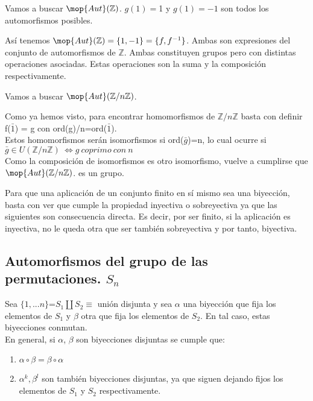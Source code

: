 \documentclass[nochap]{apuntes}
\begin{document}
\begin{example}
 Vamos a buscar $\mop{Aut}(\mathbb{Z})$. $g(1)=$1 y $g(1)=-1$ son todos los automorfismos posibles.
 
 Así tenemos $\mop{Aut}(\mathbb{Z})=\{1,-1\}=\{f, f^{-1}\}$. Ambas son expresiones del conjunto de automorfismos de $\mathbb{Z}$. Ambas constituyen grupos pero con distintas operaciones asociadas. Estas operaciones son la suma y la composición respectivamente.
\end{example}

\begin{example}
 Vamos a buscar $\mop{Aut}(\mathbb{Z}/n\mathbb{Z})$.
 
 Como ya hemos visto, para encontrar homomorfismos de $\mathbb{Z}/n\mathbb{Z}$  basta con definir f($\bar{1}$) = g con ord(g)/n=ord($\bar{1}$).\\
 Estos homomorfismos serán isomorfismos si  ord($\bar{g}$)=n, lo cual ocurre si $\bar{g}\in U(\mathbb{Z}/n\mathbb{Z}) \ \Leftrightarrow g \ coprimo \ con\ n$\\
 Como la composición de isomorfismos es otro isomorfismo, vuelve a cumplirse que $\mop{Aut}(\mathbb{Z}/n\mathbb{Z})$.  es un grupo.
\end{example}

Para que una aplicación de un conjunto finito en sí mismo sea una biyección, basta con ver que cumple la propiedad inyectiva o sobreyectiva ya que las siguientes son consecuencia directa. Es decir, por ser finito, si la aplicación es inyectiva, no le queda otra que ser también sobreyectiva y por tanto, biyectiva.

\subsection{Automorfismos del grupo de las permutaciones. $S_n$}
Sea $\{1,...n\}$=$S_1\coprod S_2\equiv$ unión disjunta y sea $\alpha$  una biyección que fija los elementos de $S_1$  y $\beta$
otra que fija los elementos de $S_2$. En tal caso, estas biyecciones conmutan.\\
En general, si $\alpha$,  $\beta$  son biyecciones disjuntas se cumple que:
\begin{enumerate}
 \item $\alpha \circ \beta = \beta \circ \alpha$
 \item $\alpha^{k}, \beta^{l}$  son también biyecciones disjuntas, ya que siguen dejando fijos los elementos de $S_1$  y $S_2$  respectivamente.
\end{enumerate}
\end{document}
